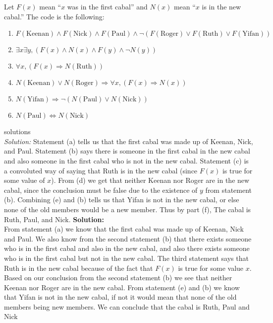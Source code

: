 \documentclass[12pt]{article}
\begin{document}
\begin{enumerate}
Let $F(x)$ mean ``$x$ was in the first cabal'' and $N(x)$ mean ``$x$ is in the new cabal.'' The code is the following:
\begin{enumerate}
\item$F(\text{Keenan})\land F(\text{Nick})\land F(\text{Paul})\land\lnot(F(\text{Roger})\lor F(\text{Ruth})\lor F(\text{Yifan}))$
\item$\exists x\exists y, (F(x)\land N(x)\land F(y)\land \lnot N(y))$
\item $\forall x, (F(x)\Rightarrow N(\text{Ruth}))$
\item $N(\text{Keenan})\lor N(\text{Roger})\Rightarrow \forall x, (F(x)\Rightarrow N(x))$
\item $N(\text{Yifan}) \Rightarrow \lnot (N(\text{Paul})\lor N(\text{Nick}))$
\item $N(\text{Paul})\Leftrightarrow N(\text{Nick})$
\end{enumerate}
\if
solutions
\\\emph{Solution:} Statement (a) tells us that the first cabal was made up of Keenan, Nick, and Paul. Statement (b) says there is someone in the first cabal in the new cabal and also someone in the first cabal who is not in the new cabal. Statement (c) is a convoluted way of saying that Ruth is in the new cabal (since $F(x)$ is true for some value of $x$). From (d) we get that neither Keenan nor Roger are in the new cabal, since the conclusion must be false due to the existence of $y$ from statement (b). Combining (e) and (b) tells us that Yifan is not in the new cabal, or else none of the old members would be a new member. Thus by part (f), The cabal is Ruth, Paul, and Nick. 
\fi
\textbf{Solution: } \\From statement (a) we know that the first cabal was made up of Keenan, Nick and Paul. We also know from the second statement (b) that there exists someone who is in the first cabal and also in the new cabal, and also there exists someone who is in the first cabal but not in the new cabal. The third statement says that Ruth is in the new cabal because of the fact that $F(x)$ is true for some value $x$. Based on our conclusion from the second statement (b) we see that neither Keenan nor Roger are in the new cabal. From statement (e) and (b) we know that Yifan is not in the new cabal, if not it would mean that none of the old members being new members. We can conclude that the cabal is Ruth, Paul and Nick
\end{enumerate}
\end{document}
